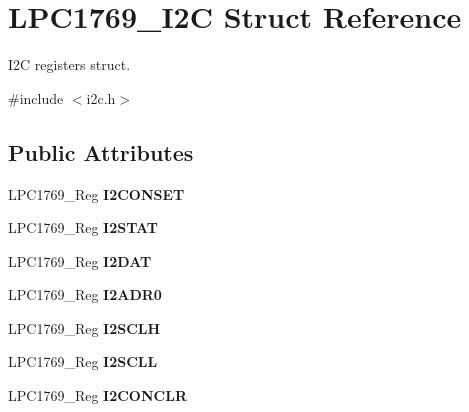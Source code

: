 \hypertarget{struct_l_p_c1769___i2_c}{\section{L\+P\+C1769\+\_\+\+I2\+C Struct Reference}
\label{struct_l_p_c1769___i2_c}
}


I2\+C registers struct.  




{\ttfamily \#include $<$i2c.\+h$>$}

\subsection*{Public Attributes}
\begin{DoxyCompactItemize}
\item 
\hypertarget{struct_l_p_c1769___i2_c_a30b12ce63510c24d1877cabaf1df978a}{L\+P\+C1769\+\_\+\+Reg {\bfseries I2\+C\+O\+N\+S\+E\+T}}\label{struct_l_p_c1769___i2_c_a30b12ce63510c24d1877cabaf1df978a}

\item 
\hypertarget{struct_l_p_c1769___i2_c_ab661090031244375bcfad95c6e01019a}{L\+P\+C1769\+\_\+\+Reg {\bfseries I2\+S\+T\+A\+T}}\label{struct_l_p_c1769___i2_c_ab661090031244375bcfad95c6e01019a}

\item 
\hypertarget{struct_l_p_c1769___i2_c_a6d30ed13074d2951c7881a37658c44ec}{L\+P\+C1769\+\_\+\+Reg {\bfseries I2\+D\+A\+T}}\label{struct_l_p_c1769___i2_c_a6d30ed13074d2951c7881a37658c44ec}

\item 
\hypertarget{struct_l_p_c1769___i2_c_ac6ccf3f6ebbd684be937852507d1180c}{L\+P\+C1769\+\_\+\+Reg {\bfseries I2\+A\+D\+R0}}\label{struct_l_p_c1769___i2_c_ac6ccf3f6ebbd684be937852507d1180c}

\item 
\hypertarget{struct_l_p_c1769___i2_c_aeefe9eb3aeb92df6ebbc307efd77459a}{L\+P\+C1769\+\_\+\+Reg {\bfseries I2\+S\+C\+L\+H}}\label{struct_l_p_c1769___i2_c_aeefe9eb3aeb92df6ebbc307efd77459a}

\item 
\hypertarget{struct_l_p_c1769___i2_c_a64819c8d1742066b38ddec5dfab24bbc}{L\+P\+C1769\+\_\+\+Reg {\bfseries I2\+S\+C\+L\+L}}\label{struct_l_p_c1769___i2_c_a64819c8d1742066b38ddec5dfab24bbc}

\item 
\hypertarget{struct_l_p_c1769___i2_c_a525a50c442bf7cf0d7bfe0877f12da98}{L\+P\+C1769\+\_\+\+Reg {\bfseries I2\+C\+O\+N\+C\+L\+R}}\label{struct_l_p_c1769___i2_c_a525a50c442bf7cf0d7bfe0877f12da98}


\end{DoxyCompactItemize}
